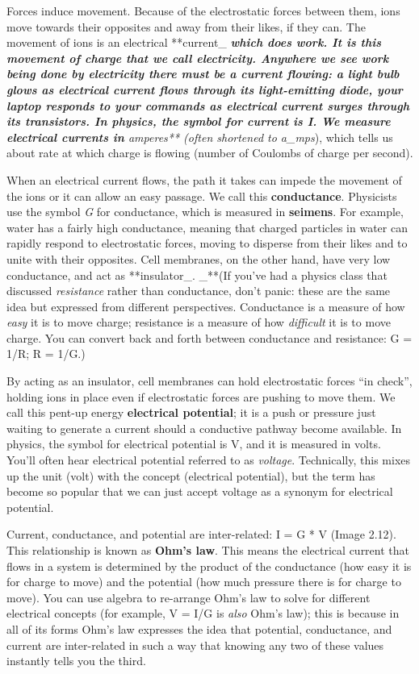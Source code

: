 \documentclass[
]{book}
\begin{document}
Forces induce movement. Because of the electrostatic forces between them, ions move towards their opposites and away from their likes, if they can. The movement of ions is an electrical **current\_ \emph{\textbf{which does \emph{work}. It is this \emph{movement} of charge that we call electricity. Anywhere we see work being done by electricity there must be a current flowing: a light bulb glows as electrical current flows through its light-emitting diode, your laptop responds to your commands as electrical current surges through its transistors. In physics, the symbol for current is \emph{I}. We measure electrical currents in }amperes** (often shortened to a\_mps}), which tells us about rate at which charge is flowing (number of Coulombs of charge per second).

When an electrical current flows, the path it takes can impede the movement of the ions or it can allow an easy passage. We call this \textbf{conductance}. Physicists use the symbol \emph{G} for conductance, which is measured in \textbf{seimens}. For example, water has a fairly high conductance, meaning that charged particles in water can rapidly respond to electrostatic forces, moving to disperse from their likes and to unite with their opposites. Cell membranes, on the other hand, have very low conductance, and act as **insulator\_. \_**(If you've had a physics class that discussed \emph{resistance} rather than conductance, don't panic: these are the same idea but expressed from different perspectives. Conductance is a measure of how \emph{easy} it is to move charge; resistance is a measure of how \emph{difficult} it is to move charge. You can convert back and forth between conductance and resistance: G = 1/R; R = 1/G.)

By acting as an insulator, cell membranes can hold electrostatic forces ``in check'', holding ions in place even if electrostatic forces are pushing to move them. We call this pent-up energy \textbf{electrical potential}; it is a push or pressure just waiting to generate a current should a conductive pathway become available. In physics, the symbol for electrical potential is V, and it is measured in volts. You'll often hear electrical potential referred to as \emph{voltage}. Technically, this mixes up the unit (volt) with the concept (electrical potential), but the term has become so popular that we can just accept voltage as a synonym for electrical potential.

Current, conductance, and potential are inter-related: I = G * V (Image 2.12). This relationship is known as \textbf{Ohm's law}. This means the electrical current that flows in a system is determined by the product of the conductance (how easy it is for charge to move) and the potential (how much pressure there is for charge to move). You can use algebra to re-arrange Ohm's law to solve for different electrical concepts (for example, V = I/G is \emph{also} Ohm's law); this is because in all of its forms Ohm's law expresses the idea that potential, conductance, and current are inter-related in such a way that knowing any two of these values instantly tells you the third.
\end{document}
